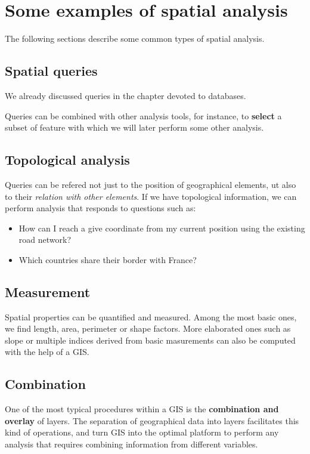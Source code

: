 \section{Some examples of spatial analysis}

The following sections describe some common types of spatial analysis.

\subsection{Spatial queries}

We already discussed queries in the chapter devoted to databases.

Queries can be combined with other analysis tools, for instance, to \textbf{select} a subset of feature with which we will later perform some other analysis.

\subsection{Topological analysis}

Queries can be refered not just to the position of geographical elements, ut also to their \emph{relation with other elements}. If we have topological information, we can perform analysis that responds to questions such as:

\begin{itemize}
\item How can I reach a give coordinate from my current position using the existing road network? 

\item Which countries share their border with France?
\end{itemize}

\subsection{Measurement} 

Spatial properties can be quantified and measured. Among the most basic ones, we find length, area, perimeter or shape factors. More elaborated ones such as slope or multiple indices derived from basic masurements can also be computed with the help of a GIS.


\subsection{Combination}

One of the most typical procedures within a GIS is the \textbf{combination and overlay} of layers. The separation of geographical data into layers facilitates this kind of operations, and turn GIS into the optimal platform to perform any analysis that requires combining information from different variables.

